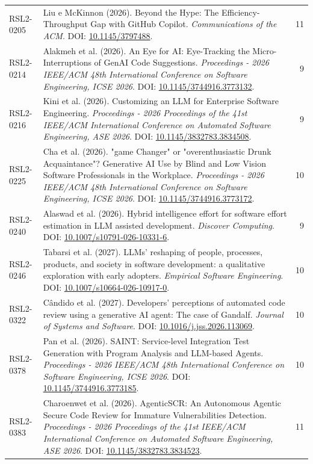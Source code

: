 \begin{small}
\begin{longtable}{lp{11.2cm}r}
RSL2-0205 & Liu e McKinnon (2026). Beyond the Hype: The Efficiency-Throughput Gap with GitHub Copilot. \textit{Communications of the ACM}. DOI: \url{10.1145/3797488}. & 11 \\
RSL2-0214 & Alakmeh et al. (2026). An Eye for AI: Eye-Tracking the Micro-Interruptions of GenAI Code Suggestions. \textit{Proceedings - 2026 IEEE/ACM 48th International Conference on Software Engineering, ICSE 2026}. DOI: \url{10.1145/3744916.3773132}. & 9 \\
RSL2-0216 & Kini et al. (2026). Customizing an LLM for Enterprise Software Engineering. \textit{Proceedings - 2026 Proceedings of the 41st IEEE/ACM International Conference on Automated Software Engineering, ASE 2026}. DOI: \url{10.1145/3832783.3834508}. & 9 \\
RSL2-0225 & Cha et al. (2026). "game Changer" or "overenthusiastic Drunk Acquaintance"? Generative AI Use by Blind and Low Vision Software Professionals in the Workplace. \textit{Proceedings - 2026 IEEE/ACM 48th International Conference on Software Engineering, ICSE 2026}. DOI: \url{10.1145/3744916.3773172}. & 10 \\
RSL2-0240 & Alaswad et al. (2026). Hybrid intelligence effort for software effort estimation in LLM assisted development. \textit{Discover Computing}. DOI: \url{10.1007/s10791-026-10331-6}. & 9 \\
RSL2-0246 & Tabarsi et al. (2027). LLMs’ reshaping of people, processes, products, and society in software development: a qualitative exploration with early adopters. \textit{Empirical Software Engineering}. DOI: \url{10.1007/s10664-026-10917-0}. & 10 \\
RSL2-0322 & Cândido et al. (2027). Developers’ perceptions of automated code review using a generative AI agent: The case of Gandalf. \textit{Journal of Systems and Software}. DOI: \url{10.1016/j.jss.2026.113069}. & 10 \\
RSL2-0378 & Pan et al. (2026). SAINT: Service-level Integration Test Generation with Program Analysis and LLM-based Agents. \textit{Proceedings - 2026 IEEE/ACM 48th International Conference on Software Engineering, ICSE 2026}. DOI: \url{10.1145/3744916.3773185}. & 10 \\
RSL2-0383 & Charoenwet et al. (2026). AgenticSCR: An Autonomous Agentic Secure Code Review for Immature Vulnerabilities Detection. \textit{Proceedings - 2026 Proceedings of the 41st IEEE/ACM International Conference on Automated Software Engineering, ASE 2026}. DOI: \url{10.1145/3832783.3834523}. & 11 \\

\end{longtable}
\end{small}
